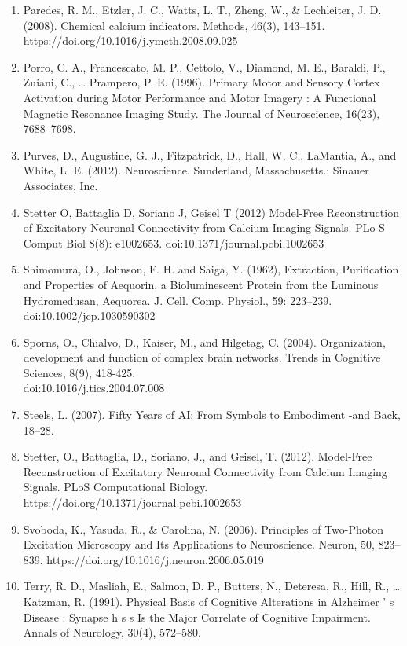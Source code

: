 \documentclass{article}
\begin{document}
\begin{enumerate}
\item Paredes, R. M., Etzler, J. C., Watts, L. T., Zheng, W., & Lechleiter, J. D. (2008). Chemical calcium indicators. Methods, 46(3), 143–151. https://doi.org/10.1016/j.ymeth.2008.09.025
\item Porro, C. A., Francescato, M. P., Cettolo, V., Diamond, M. E., Baraldi, P., Zuiani, C., … Prampero, P. E. (1996). Primary Motor and Sensory Cortex Activation during Motor Performance and Motor Imagery : A Functional Magnetic Resonance Imaging Study. The Journal of Neuroscience, 16(23), 7688–7698.
\item Purves, D., Augustine, G. J., Fitzpatrick, D., Hall, W. C., LaMantia, A., and White, L. E. (2012). Neuroscience. Sunderland, Massachusetts.: Sinauer Associates, Inc.
\item Stetter  O,  Battaglia  D,  Soriano  J,  Geisel  T  (2012)  Model-Free  Reconstruction  of  Excitatory  Neuronal  Connectivity  from  Calcium  Imaging  Signals.  PLo S Comput  Biol  8(8):  e1002653.  doi:10.1371/journal.pcbi.1002653
\item Shimomura, O., Johnson, F. H. and Saiga, Y. (1962), Extraction, Purification and Properties of Aequorin, a Bioluminescent Protein from the Luminous Hydromedusan, Aequorea. J. Cell. Comp. Physiol., 59: 223–239. doi:10.1002/jcp.1030590302
\item Sporns, O., Chialvo, D., Kaiser, M., and Hilgetag, C. (2004). Organization, development and function of complex brain networks. Trends in Cognitive Sciences, 8(9), 418-425. \\doi:10.1016/j.tics.2004.07.008
\item Steels, L. (2007). Fifty Years of AI: From Symbols to Embodiment -and Back, 18–28.
\item Stetter, O., Battaglia, D., Soriano, J., and Geisel, T. (2012). Model-Free Reconstruction of Excitatory Neuronal Connectivity from Calcium Imaging Signals. PLoS Computational Biology. https://doi.org/10.1371/journal.pcbi.1002653
\item Svoboda, K., Yasuda, R., & Carolina, N. (2006). Principles of Two-Photon Excitation Microscopy and Its Applications to Neuroscience. Neuron, 50, 823–839. https://doi.org/10.1016/j.neuron.2006.05.019
\item Terry, R. D., Masliah, E., Salmon, D. P., Butters, N., Deteresa, R., Hill, R., … Katzman, R. (1991). Physical Basis of Cognitive Alterations in Alzheimer ’ s Disease : Synapse h s s Is the Major Correlate of Cognitive Impairment. Annals of Neurology, 30(4), 572–580.

\end{enumerate}
\end{document}
